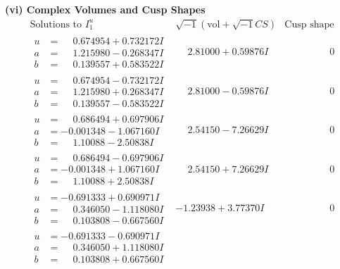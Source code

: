 \documentclass[1p]{elsarticle_modified}
\theoremstyle{definition}
\newcommand{\I}{\sqrt{-1}}
\begin{document}
\newpage\flushleft \textbf{(vi) Complex Volumes and Cusp Shapes}
$$\begin{array}{c|c|c}  
\text{Solutions to }I^u_{1}& \I (\text{vol} + \sqrt{-1}CS) & \text{Cusp shape}\\
 \hline 
\begin{aligned}
u &= \phantom{-}0.674954 + 0.732172 I \\
a &= \phantom{-}1.215980 - 0.268347 I \\
b &= \phantom{-}0.139557 + 0.583522 I\end{aligned}
 & \phantom{-}2.81000 + 0.59876 I & \phantom{-0.000000 } 0 \\ \hline\begin{aligned}
u &= \phantom{-}0.674954 - 0.732172 I \\
a &= \phantom{-}1.215980 + 0.268347 I \\
b &= \phantom{-}0.139557 - 0.583522 I\end{aligned}
 & \phantom{-}2.81000 - 0.59876 I & \phantom{-0.000000 } 0 \\ \hline\begin{aligned}
u &= \phantom{-}0.686494 + 0.697906 I \\
a &= -0.001348 - 1.067160 I \\
b &= \phantom{-}1.10088 - 2.50838 I\end{aligned}
 & \phantom{-}2.54150 - 7.26629 I & \phantom{-0.000000 } 0 \\ \hline\begin{aligned}
u &= \phantom{-}0.686494 - 0.697906 I \\
a &= -0.001348 + 1.067160 I \\
b &= \phantom{-}1.10088 + 2.50838 I\end{aligned}
 & \phantom{-}2.54150 + 7.26629 I & \phantom{-0.000000 } 0 \\ \hline\begin{aligned}
u &= -0.691333 + 0.690971 I \\
a &= \phantom{-}0.346050 - 1.118080 I \\
b &= \phantom{-}0.103808 - 0.667560 I\end{aligned}
 & -1.23938 + 3.77370 I & \phantom{-0.000000 } 0 \\ \hline\begin{aligned}
u &= -0.691333 - 0.690971 I \\
a &= \phantom{-}0.346050 + 1.118080 I \\
b &= \phantom{-}0.103808 + 0.667560 I\end{aligned}

\end{array}$$
\end{document}
